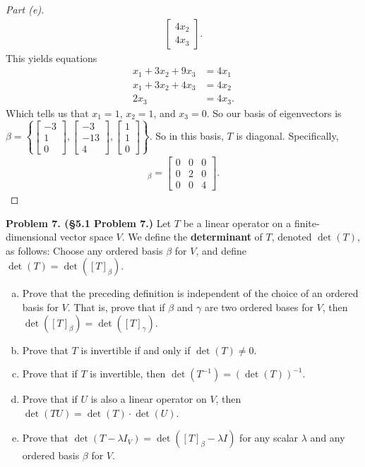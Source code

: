 \documentclass[leqno]{article}
\theoremstyle{nonumberplain}
\newtheorem{proof}{Proof}
\begin{document}
\begin{proof}[Part (e)]
\begin{align*}
\begin{bmatrix}
4x_2\\
4x_3
\end{bmatrix}.
\end{align*}
This yields equations
\begin{align*}
x_1+3x_2+9x_3&=4x_1\\
x_1+3x_2+4x_3&=4x_2\\
2x_3&=4x_3.
\end{align*}
Which tells us that $x_1=1$, $x_2=1$, and $x_3=0$.  So our basis of eigenvectors is $\beta=\left\{\begin{bmatrix} -3\\1\\0\end{bmatrix},\begin{bmatrix} -3\\-13\\4 \end{bmatrix}, \begin{bmatrix} 1\\ 1\\ 0\end{bmatrix}\right\}$.  So in this basis, $T$ is diagonal. Specifically,
\begin{align*}
[T]_\beta = \begin{bmatrix}
0 & 0 & 0\\
0 & 2 & 0\\
0 & 0 & 4
\end{bmatrix}.
\end{align*}
\end{proof}

\pagebreak






\noindent\textbf{Problem 7. (\S 5.1 Problem 7.)} Let $T$ be a linear operator on a finite-dimensional vector space $V$. We define the \textbf{determinant} of $T$, denoted $\det(T)$, as follows: Choose any ordered basis $\beta$ for $V$, and define $\det(T)=\det([T]_\beta)$.
\begin{enumerate}[(a)]
\item Prove that the preceding definition is independent of the choice of an ordered basis for $V$.  That is, prove that if $\beta$ and $\gamma$ are two ordered bases for $V$, then $\det([T]_\beta)=\det([T]_\gamma)$.
\item Prove that $T$ is invertible if and only if $\det(T)\neq 0$.
\item Prove that if $T$ is invertible, then $\det(T^{-1})=(\det(T))^{-1}$.
\item Prove that if $U$ is also a linear operator on $V$, then $\det(TU)=\det(T)\cdot \det(U)$. 
\item Prove that $\det(T-\lambda I_V)=\det([T]_\beta - \lambda I)$ for any scalar $\lambda$ and any ordered basis $\beta$ for $V$.
\end{enumerate}
\end{document}
